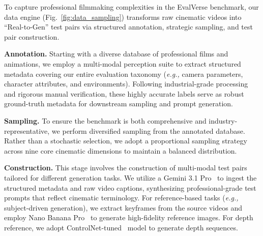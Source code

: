 \documentclass{llmxive}
\begin{document}
To capture professional filmmaking complexities in the EvalVerse benchmark, our data engine (Fig.~\ref{fig:data_sampling}) transforms raw cinematic videos into ``Real-to-Gen'' test pairs via structured annotation, strategic sampling, and test pair construction.


\noindent \textbf{Annotation.} Starting with a diverse database of professional films and animations, we employ a multi-modal perception suite to extract structured metadata covering our entire evaluation taxonomy (\textit{e.g.,} camera parameters, character attributes, and environments). Following industrial-grade processing and rigorous manual verification, these highly accurate labels serve as robust ground-truth metadata for downstream sampling and prompt generation.

\noindent \textbf{Sampling.} To ensure the benchmark is both comprehensive and industry-representative, we perform diversified sampling from the annotated database. Rather than a stochastic selection, we adopt a proportional sampling strategy across nine core cinematic dimensions to maintain a balanced distribution.

\noindent
 \textbf{Construction.} This stage involves the construction of multi-modal test pairs tailored for different generation tasks. We utilize a Gemini 3.1 Pro~\cite{gemini} to ingest the structured metadata and raw video captions, synthesizing professional-grade test prompts that reflect cinematic terminology. For reference-based tasks (\textit{e.g.,} subject-driven generation), we extract keyframes from the source videos and employ Nano Banana Pro~\cite{nanobanana} to generate high-fidelity reference images. For depth reference, we adopt ControlNet-tuned~\cite{controlnet} model to generate depth sequences.
\end{document}
